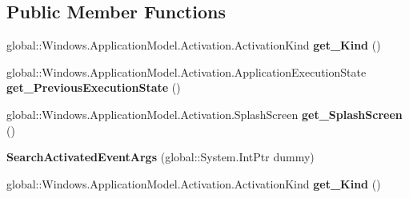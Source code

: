 \subsection*{Public Member Functions}
\begin{DoxyCompactItemize}
\item 
\mbox{\label{class_windows_1_1_application_model_1_1_activation_1_1_search_activated_event_args_ae745f93bbbb9f56dc031cdb191ee965f}} 
global\+::\+Windows.\+Application\+Model.\+Activation.\+Activation\+Kind {\bfseries get\+\_\+\+Kind} ()
\item 
\mbox{\label{class_windows_1_1_application_model_1_1_activation_1_1_search_activated_event_args_a9abe0a792ef91c56e434e48928763f23}} 
global\+::\+Windows.\+Application\+Model.\+Activation.\+Application\+Execution\+State {\bfseries get\+\_\+\+Previous\+Execution\+State} ()
\item 
\mbox{\label{class_windows_1_1_application_model_1_1_activation_1_1_search_activated_event_args_a7bb7e56771d1d46337355c17b4369b92}} 
global\+::\+Windows.\+Application\+Model.\+Activation.\+Splash\+Screen {\bfseries get\+\_\+\+Splash\+Screen} ()
\item 
\mbox{\label{class_windows_1_1_application_model_1_1_activation_1_1_search_activated_event_args_aea1c8ddcb207b9f98acf647773786b5f}} 
{\bfseries Search\+Activated\+Event\+Args} (global\+::\+System.\+Int\+Ptr dummy)
\item 
\mbox{\label{class_windows_1_1_application_model_1_1_activation_1_1_search_activated_event_args_ae745f93bbbb9f56dc031cdb191ee965f}} 
global\+::\+Windows.\+Application\+Model.\+Activation.\+Activation\+Kind {\bfseries get\+\_\+\+Kind} ()
\item 
\mbox{\label{class_windows_1_1_application_model_1_1_activation_1_1_search_activated_event_args_a9abe0a792ef91c56e434e48928763f23}} 

\end{DoxyCompactItemize}
